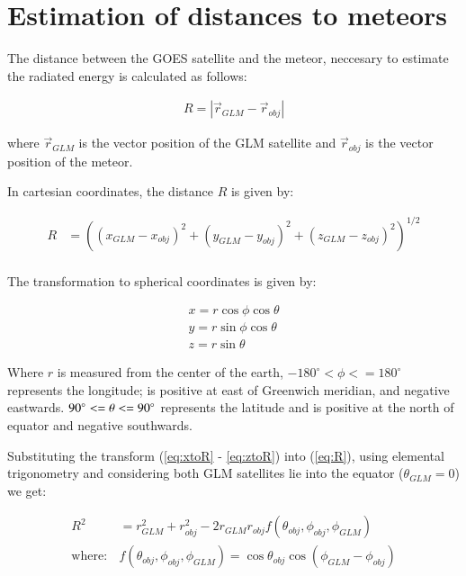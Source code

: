 \appendix


\section{Estimation of distances to meteors}
\label{app:distance}
The distance between the GOES satellite and the meteor, neccesary to estimate the radiated energy is calculated as follows:

\begin{align}
  R = \left|\vec{r}_{GLM} - \vec{r}_{obj} \right|
\end{align}

where $\vec{r}_{GLM}$ is the vector position of the GLM satellite and $\vec{r}_{obj}$ is the vector position of the meteor.

In cartesian coordinates, the distance $R$ is given by:

\begin{align}
  R &= \left((x_{GLM}-x_{obj})^2 + (y_{GLM}-y_{obj})^2 + (z_{GLM}-z_{obj})^2\right)^{1/2} \label{eq:R}\\
\end{align}

The transformation to spherical coordinates is given by:

\begin{align}
  x = r\cos\phi\cos\theta \label{eq:xtoR}\\
  y = r\sin\phi\cos\theta \label{eq:ytoR}\\
  z = r\sin\theta \label{eq:ztoR}
\end{align}

Where $r$ is measured from the center of the earth, $ -180^\circ < \phi <= 180^\circ$ represents the longitude; is positive at east of Greenwich meridian, and negative eastwards. $\-90^\circ <= \theta <= 90^\circ$ represents the latitude and is positive at the north of equator and negative southwards.

Substituting the transform (\ref{eq:xtoR} - \ref{eq:ztoR}) into (\ref{eq:R}), using elemental trigonometry and considering both GLM satellites lie into the equator ($\theta_{GLM}=0$) we get:

\begin{align}
  R^2 &= r_{GLM}^2 + r_{obj}^2 - 2r_{GLM}r_{obj}f(\theta_{obj}, \phi_{obj}, \phi_{GLM}) \label{eq:R2}\\
  \mathrm{where:} & f(\theta_{obj}, \phi_{obj}, \phi_{GLM}) = \cos\theta_{obj}\cos\left(\phi_{GLM}-\phi_{obj}\right)
\end{align}

